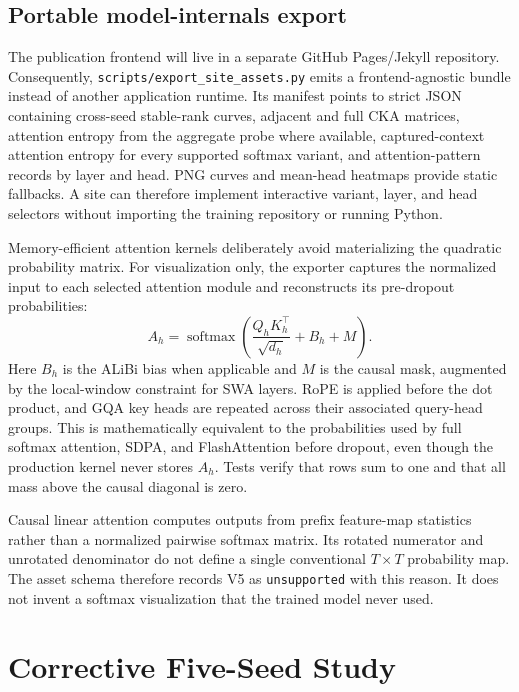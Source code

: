 \documentclass[11pt,a4paper]{article}
\theoremstyle{definition}
\theoremstyle{plain}
\begin{document}
\subsection{Portable model-internals export}

The publication frontend will live in a separate GitHub Pages/Jekyll repository.
Consequently, \texttt{scripts/export\_site\_assets.py} emits a frontend-agnostic
bundle instead of another application runtime.  Its manifest points to strict JSON
containing cross-seed stable-rank curves, adjacent and full CKA matrices, attention
entropy from the aggregate probe where available, captured-context attention entropy
for every supported softmax variant, and attention-pattern records by layer and head.
PNG curves and mean-head heatmaps provide static fallbacks.  A site can therefore
implement interactive
variant, layer, and head selectors without importing the training repository or
running Python.

Memory-efficient attention kernels deliberately avoid materializing the quadratic
probability matrix.  For visualization only, the exporter captures the normalized
input to each selected attention module and reconstructs its pre-dropout probabilities:
\[
    A_h = \operatorname{softmax}\!\left(
        \frac{Q_h K_h^\top}{\sqrt{d_h}} + B_h + M
    \right).
\]
Here \(B_h\) is the ALiBi bias when applicable and \(M\) is the causal mask,
augmented by the local-window constraint for SWA layers.  RoPE is applied before the
dot product, and GQA key heads are repeated across their associated query-head groups.
This is mathematically equivalent to the probabilities used by full softmax attention,
SDPA, and FlashAttention before dropout, even though the production kernel never
stores \(A_h\).  Tests verify that rows sum to one and that all mass above the causal
diagonal is zero.

\begin{warningbox}
Causal linear attention computes outputs from prefix feature-map statistics rather
than a normalized pairwise softmax matrix.  Its rotated numerator and unrotated
denominator do not define a single conventional \(T\!\times\!T\) probability map.
The asset schema therefore records V5 as \texttt{unsupported} with this reason.  It
does not invent a softmax visualization that the trained model never used.
\end{warningbox}

\section{Corrective Five-Seed Study}
\label{sec:corrective-five-seed-study}
\end{document}
